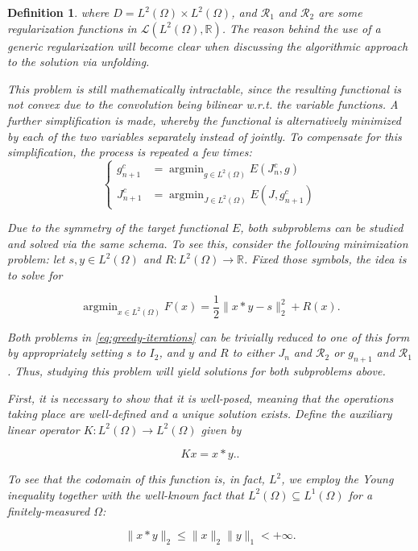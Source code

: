 \documentclass[twocolumn,twoside,a4paper,10pt]{IEEEtran}
\newtheorem{definition}{Definition}
\DeclareMathOperator*{\argmin}{\operatorname*{argmin}}
\begin{document}
\begin{definition}
where \(D = L^2(\Omega)\times L^2(\Omega)\), and \(\mathcal{R}_1\) and \(\mathcal{R}_2\) are some regularization functions in \(\mathcal{L}(L^2(\Omega), \mathbb{R})\). The reason behind the use of a generic regularization will become clear when discussing the algorithmic approach to the solution via unfolding.

This problem is still mathematically intractable, since the resulting functional is not convex due to the convolution being bilinear w.r.t. the variable functions. A further simplification is made, whereby the functional is alternatively minimized by each of the two variables separately instead of jointly. To compensate for this simplification, the process is repeated a few times:
\begin{equation}\label{eq:greedy-iterations}
  \left\{\begin{split}
    g_{n+1}^c &= \argmin_{g\in L^2(\Omega)} E(J_n^c, g) \\
    J_{n+1}^c &= \argmin_{J\in L^2(\Omega)} E(J, g_{n+1}^c)
  \end{split}\right.
\end{equation}

Due to the symmetry of the target functional \(E\), both subproblems can be studied and solved via the same schema. To see this, consider the following minimization problem: let \(s, y\in L^2(\Omega)\) and \(R\colon L^2(\Omega)\to\mathbb{R}\). Fixed those symbols, the idea is to solve for

\[
  \argmin_{x\in L^2(\Omega)}F(x) = \frac12\|x\ast y - s\|_2^2 + R(x)
.\]

Both problems in \cref{eq:greedy-iterations} can be trivially reduced to one of this form by appropriately setting \(s\) to \(I_2\), and \(y\) and \(R\) to either \(J_n\) and \(\mathcal{R}_2\) or \(g_{n+1}\) and \(\mathcal{R}_1\). Thus, studying this problem will yield solutions for both subproblems above.

First, it is necessary to show that it is well-posed, meaning that the operations taking place are well-defined and a unique solution exists. Define the auxiliary linear operator \(K\colon L^2(\Omega)\to L^2(\Omega)\) given by

\[
  Kx=x\ast y.
.\]

To see that the codomain of this function is, in fact, \(L^2\), we employ the Young inequality together with the well-known fact that \(L^2(\Omega)\subseteq L^1(\Omega)\) for a finitely-measured \(\Omega\):

\[
  \|x\ast y\|_2 \leq \|x\|_{2}\|y\|_{1} < +\infty
.\]


\end{definition}
\end{document}
